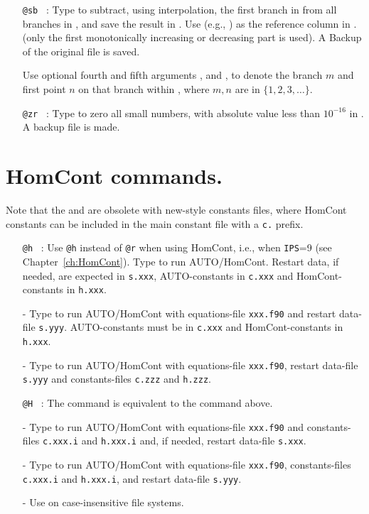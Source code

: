 \documentclass[12pt]{report}
\begin{document}
\begin{itemize}
\item[\tt @sb]~:
  Type  to subtract, using interpolation, the first
  branch in  from all branches in ,
  and save the result in .
  Use  (e.g., ) as the reference
  column in .
  (only the first monotonically increasing or decreasing part is used).
  A Backup of the original file is saved.

  Use optional fourth and fifth arguments , and
  , to denote the
  branch $m$ and first point $n$ on that branch within ,
  where $m,n$ are in $\{1,2,3,\ldots\}$.

\item[\tt @zr]~:
  Type  to zero all small numbers, with absolute
  value less than $10^{-16}$ in . A backup file is made.

\end{itemize}

\section{ HomCont commands.} 

Note that the  and  are obsolete with
new-style constants files, where HomCont constants can be included in
the main constant file with a {\tt c.} prefix.
\begin{itemize}
\item[\tt @h]~:
  Use {\tt @h} instead of {\tt @r} when using {\cal HomCont}, i.e., when {\tt IPS}=9
  (see Chapter~\ref{ch:HomCont}).
  Type  to run {\cal AUTO}/{\cal HomCont}.
  Restart data, if needed, are expected in {\tt s.xxx},
  {\cal AUTO}-constants in {\tt c.xxx} and {\cal HomCont}-constants in {\tt h.xxx}.
\item[-]
  Type  to run {\cal AUTO}/{\cal HomCont}
  with equations-file {\tt xxx.f90} and restart data-file {\tt s.yyy}.
  {\cal AUTO}-constants must be in {\tt c.xxx} and {\cal HomCont}-constants in {\tt h.xxx}.
\item[-]
  Type  to run {\cal AUTO}/{\cal HomCont}
  with equations-file {\tt xxx.f90}, restart data-file {\tt s.yyy}
  and constants-files {\tt c.zzz} and {\tt h.zzz}.

\item[\tt @H]~:
  The command  is equivalent to the command  above.
\item[-]
  Type  to run {\cal AUTO}/{\cal HomCont} with equations-file {\tt xxx.f90}
  and constants-files {\tt c.xxx.i} and {\tt h.xxx.i}
  and, if needed, restart data-file {\tt s.xxx}. 
\item[-]
  Type  to run {\cal AUTO}/{\cal HomCont}
  with equations-file {\tt xxx.f90}, 
  constants-files {\tt c.xxx.i} and {\tt h.xxx.i},
  and restart data-file {\tt s.yyy}.
\item[-]
  Use  on case-insensitive file systems.
\end{itemize}
\end{document}
